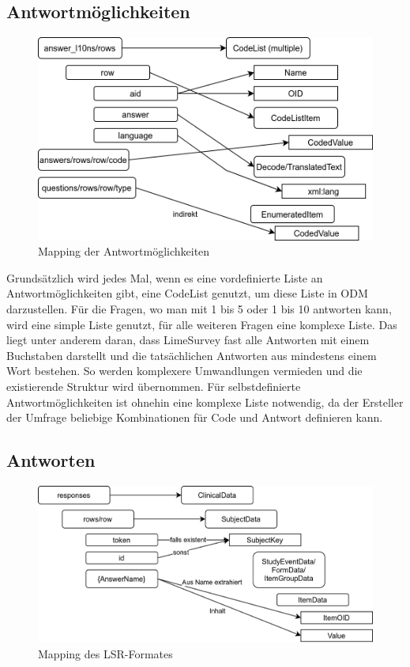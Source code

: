 \subsection{Antwortmöglichkeiten}

\begin{figure}[h]
			\centering
			\includegraphics[width=.65\textwidth]{./img/m_answers.png}
			\caption{Mapping der Antwortmöglichkeiten}
\end{figure}

Grundsätzlich wird jedes Mal, wenn es eine vordefinierte Liste an Antwortmöglichkeiten gibt, eine CodeList genutzt, um diese Liste in ODM darzustellen.
Für die Fragen, wo man mit 1 bis 5 oder 1 bis 10 antworten kann, wird eine simple Liste genutzt, für alle weiteren Fragen eine komplexe Liste.
Das liegt unter anderem daran, dass LimeSurvey fast alle Antworten mit einem Buchstaben darstellt und die tatsächlichen Antworten aus mindestens einem Wort bestehen.
So werden komplexere Umwandlungen vermieden und die existierende Struktur wird übernommen.
Für selbstdefinierte Antwortmöglichkeiten ist ohnehin eine komplexe Liste notwendig, da der Ersteller der Umfrage beliebige Kombinationen für Code und Antwort definieren kann.

\subsection{Antworten}

\begin{figure}[h]
	\centering
	\includegraphics[width=.80\textwidth]{./img/m_lsr.png}
	\caption{Mapping des LSR-Formates}
\end{figure}

